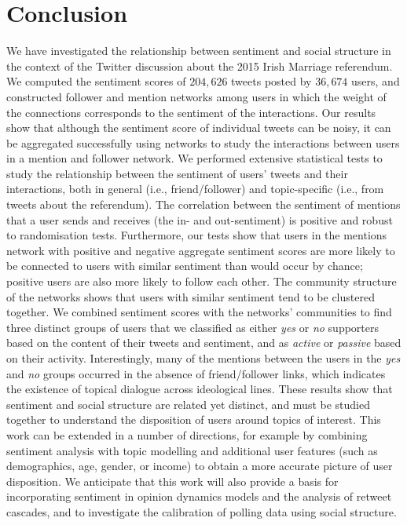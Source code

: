 \documentclass{article}
\begin{document}
\section{Conclusion}\label{sec:conclusions}


We have investigated the relationship between sentiment and social
structure in the context of the Twitter discussion about the 2015
Irish Marriage referendum. We computed the sentiment scores of
$204,626$ tweets posted by $36,674$ users, and constructed follower
and mention networks among users in which the weight of the
connections corresponds to the sentiment of the interactions.  Our
results show that although the sentiment score of individual tweets
can be noisy, it can be aggregated successfully using networks to
study the interactions between users in a mention and follower
network.  We performed extensive statistical tests to study the
relationship between the sentiment of users' tweets and their
interactions, both in general (i.e., friend/follower) and
topic-specific (i.e., from tweets about the referendum). The
correlation between the sentiment of mentions that a user sends and
receives (the in- and out-sentiment) is positive and robust to
randomisation tests. Furthermore, our tests show that users in the
mentions network with positive and negative aggregate sentiment scores
are more likely to be connected to users with similar sentiment than
would occur by chance; positive users are also more likely to follow
each other.  The community structure of the networks shows that users
with similar sentiment tend to be clustered together.  We combined
sentiment scores with the networks' communities to find three distinct
groups of users that we classified as either {\it yes} or {\it no}
supporters based on the content of their tweets and sentiment, and as
{\it active} or {\it passive} based on their activity. Interestingly,
many of the mentions between the users in the {\it yes} and {\it no}
groups occurred in the absence of friend/follower links, which
indicates the existence of topical dialogue across ideological
lines. These results show that sentiment and social structure are
related yet distinct, and must be studied together to understand the
disposition of users around topics of interest. This work can be
extended in a number of directions, for example by combining sentiment
analysis with topic modelling and additional user features (such as
demographics, age, gender, or income) to obtain a more accurate
picture of user disposition. We anticipate that this work will also
provide a basis for incorporating sentiment in opinion dynamics models
and the analysis of retweet cascades, and to investigate the
calibration of polling data using social structure.
\end{document}
